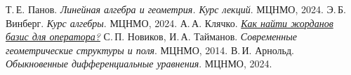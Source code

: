 \begin{thebibliography}{9}
	 Т.\,Е. Панов. \textit{Линейная алгебра и геометрия. Курс лекций}. МЦНМО, 2024.
	 Э.\,Б. Винберг. \textit{Курс алгебры}. МЦНМО, 2024.
	 А.\,А. Клячко. \href{http://halgebra.math.msu.su/staff/klyachko/teaching/lin.al/JB1.PDF}{\textit{Как найти жорданов базис для оператора?}}
	 С.\,П. Новиков, И.\,А. Тайманов. \textit{Современные геометрические структуры и поля}. МЦНМО, 2014.
	 В.\,И. Арнольд. \textit{Обыкновенные дифференциальные уравнения}. МЦНМО, 2024.
\end{thebibliography}

